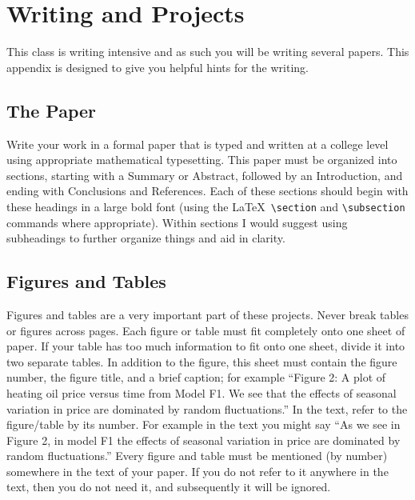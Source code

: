 \chapter{Writing and Projects}
This class is writing intensive and as such you will be writing several papers.  This
appendix is designed to give you helpful hints for the writing.

\section{The Paper} 
Write your work in a formal paper that is typed and written at a college level using
appropriate mathematical typesetting. This paper must be organized into sections, starting
with a Summary or Abstract, followed by an Introduction, and ending with Conclusions and
References. Each of these sections should begin with these headings in a large bold font
(using the \LaTeX\ \verb|\section| and \verb|\subsection| commands where appropriate).
Within sections I would suggest using subheadings to further organize things and aid in
clarity.

\section{Figures and Tables}
Figures and tables are a very important part of these projects. Never break tables or
figures across pages. Each figure or table must fit completely onto one sheet of paper. If
your table has too much information to fit onto one sheet, divide it into two separate
tables. In addition to the figure, this sheet must contain the figure number, the figure
title, and a brief caption; for example ``Figure 2: A plot of heating oil price versus time
from Model F1. We see that the effects of seasonal variation in price are dominated by
random fluctuations.'' In the text, refer to the figure/table by its number. For example in
the text you might say ``As we see in Figure 2, in model F1 the effects of seasonal 
variation in price are dominated by random fluctuations.'' Every figure and table must be
mentioned (by number) somewhere in the text of your paper. If you do not refer to it
anywhere in the text, then you do not need it, and subsequently it will be ignored.

